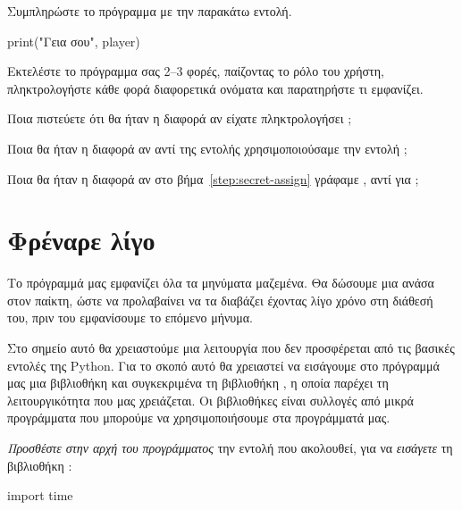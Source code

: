 \documentclass[a4paper,11pt,oneside]{book}
\begin{document}
\begin{step}
\label{step:print-variable}
Συμπληρώστε το πρόγραμμα με την παρακάτω εντολή.

\begin{pynew}
print("Γεια σου", player)
\end{pynew}

Εκτελέστε το πρόγραμμα σας 2--3 φορές, παίζοντας το ρόλο του χρήστη, πληκτρολογήστε κάθε φορά διαφορετικά ονόματα και παρατηρήστε τι εμφανίζει.

Ποια πιστεύετε ότι θα ήταν η διαφορά αν είχατε πληκτρολογήσει ;

\marginnote[14pt]{\icondiscuss}
\dottedline

\dottedline

Ποια θα ήταν η διαφορά αν αντί της εντολής  χρησιμοποιούσαμε την εντολή ;

\marginnote[14pt]{\icondiscuss}
\dottedline

\dottedline

Ποια θα ήταν η διαφορά αν στο βήμα~\ref{step:secret-assign} γράφαμε , αντί για ;

\marginnote[14pt]{\icondiscuss}
\dottedline

\dottedline
\end{step}

\section{Φρέναρε λίγο}

Το πρόγραμμά μας εμφανίζει όλα τα μηνύματα μαζεμένα. Θα δώσουμε μια ανάσα στον παίκτη, ώστε να προλαβαίνει να τα διαβάζει έχοντας λίγο χρόνο στη διάθεσή του, πριν του εμφανίσουμε το επόμενο μήνυμα. 

Στο σημείο αυτό θα χρειαστούμε μια λειτουργία που δεν προσφέρεται από τις βασικές εντολές της Python. Για το σκοπό αυτό θα χρειαστεί να εισάγουμε στο πρόγραμμά μας μια βιβλιοθήκη και συγκεκριμένα τη βιβλιοθήκη , η οποία παρέχει τη λειτουργικότητα που μας χρειάζεται. Οι βιβλιοθήκες είναι συλλογές από μικρά προγράμματα που μπορούμε να χρησιμοποιήσουμε στα προγράμματά μας.

\begin{step}
\emph{Προσθέστε στην αρχή του προγράμματος} την εντολή που ακολουθεί, για να \emph{εισάγετε} τη βιβλιοθήκη :

\begin{pynew}
import time
\end{pynew}
\end{step}
\end{document}
